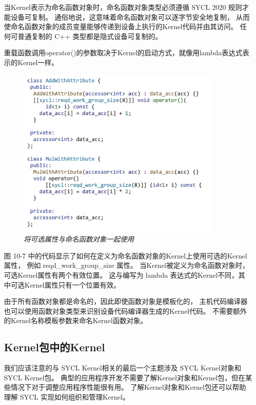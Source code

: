 当Kernel表示为命名函数对象时，命名函数对象类型必须遵循 SYCL 2020 规则才能设备可复制。 
通俗地说，这意味着命名函数对象可以逐字节安全地复制，
从而使命名函数对象的成员变量能够传递到设备上执行的Kernel代码并由其访问。 
任何可普通复制的 C++ 类型都是隐式设备可复制的。

重载函数调用operator()的参数取决于Kernel的启动方式，就像用lambda表达式表示的Kernel一样。

\begin{figure}[H]
	\centering
	\includegraphics[width=0.9\textwidth]{figs/F10.7.png}
	\caption{\textit{将可选属性与命名函数对象一起使用 }}
\end{figure}

图 10-7 中的代码显示了如何在定义为命名函数对象的Kernel上使用可选的Kernel属性，
例如 reqd\_work\_group\_size 属性。 
当Kernel被定义为命名函数对象时，可选Kernel属性有两个有效位置。 
这与编写为 lambda 表达式的Kernel不同，其中可选Kernel属性只有一个位置有效。

由于所有函数对象都是命名的，因此即使函数对象是模板化的，
主机代码编译器也可以使用函数对象类型来识别设备代码编译器生成的Kernel代码。 
不需要额外的Kernel名称模板参数来命名Kernel函数对象。

\subsection{Kernel包中的Kernel}
我们应该注意的与 SYCL Kernel相关的最后一个主题涉及 SYCL Kernel对象和 SYCL Kernel包。 
典型的应用程序开发不需要了解Kernel对象和Kernel包，但在某些情况下对于调整应用程序性能很有用。 
了解Kernel对象和Kernel包还可以帮助理解 SYCL 实现如何组织和管理Kernel。

